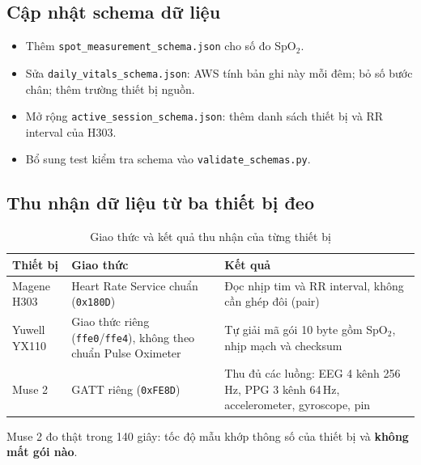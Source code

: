 \documentclass[12pt,a4paper]{article}
\newcommand{\spo}{SpO$_2$}
\newcommand{\code}[1]{\texttt{#1}}
\begin{document}
\subsection{Cập nhật schema dữ liệu}

\begin{itemize}
  \item Thêm \code{spot\_measurement\_schema.json} cho số đo \spo.
  \item Sửa \code{daily\_vitals\_schema.json}: AWS tính bản ghi này mỗi đêm; bỏ số bước chân; thêm trường thiết bị nguồn.
  \item Mở rộng \code{active\_session\_schema.json}: thêm danh sách thiết bị và RR interval của H303.
  \item Bổ sung test kiểm tra schema vào \code{validate\_schemas.py}.
\end{itemize}

\subsection{Thu nhận dữ liệu từ ba thiết bị đeo}

\begin{table}[h]
  \centering
  \caption{Giao thức và kết quả thu nhận của từng thiết bị}
  \begin{tabularx}{\textwidth}{@{}p{2.6cm}p{4.4cm}L@{}}
    \toprule
    Thiết bị & Giao thức & Kết quả \\
    \midrule
    Magene H303 & Heart Rate Service chuẩn (\code{0x180D}) & Đọc nhịp tim và RR interval, không cần ghép đôi (pair) \\
    Yuwell YX110 & Giao thức riêng (\code{ffe0}/\code{ffe4}), không theo chuẩn Pulse Oximeter & Tự giải mã gói 10 byte gồm \spo, nhịp mạch và checksum \\
    Muse 2 & GATT riêng (\code{0xFE8D}) & Thu đủ các luồng: EEG 4 kênh 256\,Hz, PPG 3 kênh 64\,Hz, accelerometer, gyroscope, pin \\
    \bottomrule
  \end{tabularx}
\end{table}

Muse 2 đo thật trong 140 giây: tốc độ mẫu khớp thông số của thiết bị và \textbf{không mất gói nào}.

\end{document}

